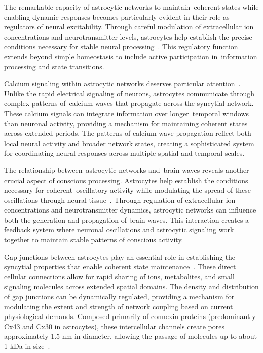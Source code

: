 The remarkable capacity of astrocytic networks to maintain~coherent states while enabling dynamic responses becomes particularly evident in their role as regulators of neural excitability. Through careful modulation of extracellular ion concentrations and neurotransmitter levels, astrocytes help establish the precise conditions necessary for stable neural processing~\cite{Araque2014, Bellot-Saez2017}. This regulatory function extends beyond simple homeostasis to include active participation in~information processing and state transitions.

Calcium signaling within astrocytic networks deserves particular attention~\cite{Bazargani2016, Volterra2005}. Unlike the rapid electrical signaling of neurons, astrocytes communicate through complex patterns of~calcium waves that propagate across the syncytial network. These calcium signals can integrate information over longer~temporal windows than neuronal activity, providing a mechanism for maintaining coherent states across extended periods. The patterns of calcium wave propagation reflect both local neural activity and broader network states, creating a sophisticated system for coordinating neural responses across multiple spatial and temporal scales.

The relationship between~astrocytic networks and~brain waves reveals another crucial aspect of conscious processing. Astrocytes help establish the conditions necessary for coherent~oscillatory activity while modulating the spread of these oscillations through neural tissue~\cite{Volterra2005, Poskanzer2016}. Through regulation of extracellular ion concentrations and neurotransmitter dynamics, astrocytic networks can influence both the generation and propagation of brain waves. This interaction creates a feedback system where neuronal oscillations and astrocytic signaling work together to maintain stable patterns of conscious activity.

Gap junctions between astrocytes play an essential role in establishing the syncytial properties that enable coherent state maintenance~\cite{Wallraff2006, Nagy2018}. These direct cellular connections allow for rapid sharing of ions, metabolites, and small signaling molecules across extended spatial domains. The density and distribution of gap junctions can be dynamically regulated, providing a mechanism for modulating the extent and strength of network coupling based on current physiological demands. Composed primarily of connexin proteins (predominantly Cx43 and Cx30 in astrocytes), these intercellular channels create pores approximately 1.5 nm in diameter, allowing the passage of molecules up to about 1 kDa in size~\cite{Giaume2010, Nagy2018}.

